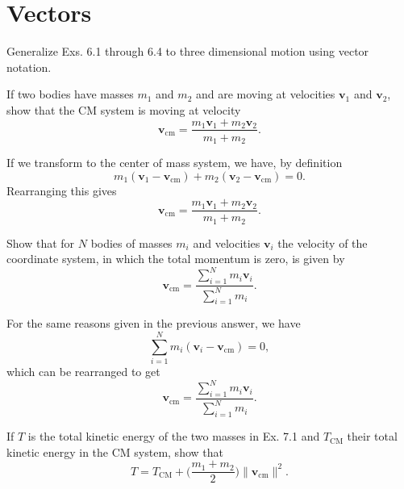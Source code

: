 \documentclass[../feynman-lectures-on-physics.tex]{subfiles}
\begin{document}
\section{Vectors}

Generalize Exs. 6.1 through 6.4 to three dimensional motion using vector notation.

\begin{questions}
\question If two bodies have masses $m_1$ and $m_2$ and are moving at velocities $\mathbf{v}_1$ and $\mathbf{v}_2$, show that the CM system is moving at velocity
  \[
    \mathbf{v}_{\text{cm}} = \frac{m_1\mathbf{v}_1 + m_2\mathbf{v}_2}{m_1+m_2}
    .\] 

  \begin{solution}
    If we transform to the center of mass system, we have, by definition		
    \[
      m_1(\mathbf{v}_1 - \mathbf{v}_{\text{cm}}) + m_2(\mathbf{v}_2 - \mathbf{v}_{\text{cm}}) = 0
      .\] 
    Rearranging this gives
    \[
      \mathbf{v}_{\text{cm}} = \frac{m_1\mathbf{v}_1 + m_2\mathbf{v}_2}{m_1+m_2}
      .\] 
  \end{solution}

\question Show that for $N$ bodies of masses $m_i$ and velocities $\mathbf{v}_i$ the velocity of the coordinate system, in which the total momentum is zero, is given by
  \[
    \mathbf{v}_{\text{cm}} = \frac{\sum_{i=1}^Nm_i\mathbf{v}_i}{\sum_{i=1}^Nm_i}
    .\] 

  \begin{solution}
    For the same reasons given in the previous answer, we have
    \[
      \sum_{i=1}^Nm_i(\mathbf{v}_i - \mathbf{v}_{\text{cm}}) = 0
      ,\] 
    which can be rearranged to get
    \[
      \mathbf{v}_{\text{cm}} = \frac{\sum_{i=1}^Nm_i\mathbf{v}_i}{\sum_{i=1}^Nm_i}
      .\] 
  \end{solution}

\question If $T$ is the total kinetic energy of the two masses in Ex. 7.1 and $T_{\text{CM}}$ their total kinetic energy in the CM system, show that
\[
T = T_{\text{CM}} + \Big(\frac{m_1+m_2}{2}\Big)\|\mathbf{v}_{\text{cm}}\|^2
.\] 


\end{questions}
\end{document}
